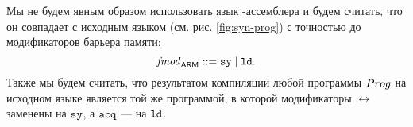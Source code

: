 Мы не будем явным образом использовать язык \ARM-ассемблера
и будем считать, что он совпадает с исходным языком (см. рис. \ref{fig:syn-prog}) с точностью до
модификаторов барьера памяти:
\[\mathit{fmod}_{\mathsf{ARM}} ::= \mathtt{sy} \mid \mathtt{ld}. \]
Также мы будем считать, что результатом компиляции любой программы $Prog$ на исходном языке
является той же программой, в которой модификаторы $\rel$ заменены на $\mathtt{sy}$, а ${\mathtt{acq}}$ --- на $\mathtt{ld}$.




